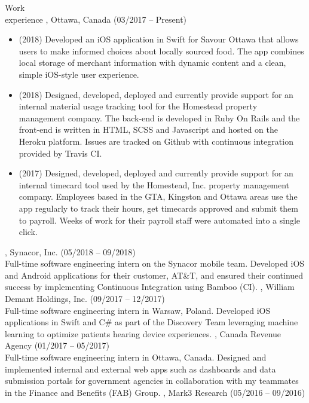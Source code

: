 \documentclass{resume}
\begin{document}
\begin{category}{Work \\experience}
, Ottawa, Canada (03/2017 -- Present)
\begin{itemize}
  \item (2018) Developed an iOS application in Swift for Savour Ottawa that allows
    users to make informed choices about locally sourced food. The app combines
    local storage of merchant information with dynamic content and a clean,
    simple iOS-style user experience.
  \item (2018) Designed, developed, deployed and currently provide support for an
    internal material usage tracking tool for the Homestead property management 
    company. The back-end is developed in Ruby On Rails and the front-end is written 
    in HTML, SCSS and Javascript and hosted on the Heroku platform. Issues are tracked
    on Github with continuous integration provided by Travis CI.
  \item (2017) Designed, developed, deployed and currently provide support for an
    internal timecard tool used by the Homestead, Inc. property management company.
    Employees based in the GTA, Kingston and Ottawa areas use the app regularly to
    track their hours, get timecards approved and submit them to payroll.
    Weeks of work for their payroll staff were automated into a single click.
  \end{itemize}
, Synacor, Inc. (05/2018 -- 09/2018)\\
Full-time software engineering intern on the Synacor mobile team.
Developed iOS and Android applications for their customer, AT\&T, and ensured
their continued success by implementing Continuous Integration using Bamboo (CI).
, William Demant Holdings, Inc. (09/2017 -- 12/2017)\\
Full-time software engineering intern in Warsaw, Poland.
Developed iOS applications in Swift and C\# as part of the Discovery Team leveraging machine
learning to optimize patients hearing device experiences.
, Canada Revenue Agency (01/2017 -- 05/2017)\\
Full-time software engineering intern in Ottawa, Canada. Designed and implemented internal
and external web apps such as dashboards and data submission portals for government agencies
in collaboration with my teammates in the Finance and Benefits (FAB) Group.
, Mark3 Research (05/2016 -- 09/2016)\\

\end{category}
\end{document}
